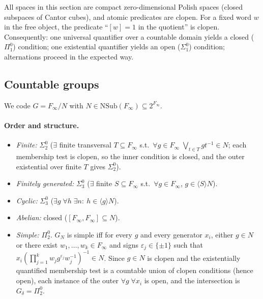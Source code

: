 \documentclass[12pt,fleqn,a4paper]{amsart}
\numberwithin{equation}{section}
\theoremstyle{definition}
\newcommand{\NSub}{\mathrm{NSub}}
\begin{document}
All spaces in this section are compact zero-dimensional Polish spaces (closed subspaces
of Cantor cubes), and atomic predicates are clopen.  For a fixed word $w$ in the free
object, the predicate ``$[w]=1$ in the quotient'' is clopen.  Consequently:
one universal quantifier over a countable domain yields a closed
($\Pi^0_1$) condition;
one existential quantifier yields an open ($\Sigma^0_1$) condition;
alternations proceed in the expected way.

\subsection{Countable groups}\label{subsec:groups}

We code $G=F_\infty/N$ with $N\in\NSub(F_\infty)\subseteq 2^{F_\infty}$.

\paragraph{Order and structure.}
\begin{itemize}
\item \emph{Finite:} $\Sigma^0_2$ ($\exists$ finite transversal
$T\subseteq F_\infty$ s.t.\ $\forall g\in F_\infty\;\bigvee_{t\in T} gt^{-1}\in N$;
each membership test is clopen, so the inner condition is closed, and the outer
existential over finite $T$ gives $\Sigma^0_2$).
\item \emph{Finitely generated:} $\Sigma^0_3$ ($\exists$ finite $S\subseteq F_\infty$
s.t.\ $\forall g\in F_\infty$, $g\in\langle S\rangle N$).
\item \emph{Cyclic:} $\Sigma^0_3$ ($\exists g\;\forall h\;\exists n:\ h\in\langle g\rangle N$).
\item \emph{Abelian:} closed ($[F_\infty,F_\infty]\subseteq N$).
\item \emph{Simple:} $\Pi^0_2$.
$G_N$ is simple iff for every $g$ and every generator $x_i$,
either $g\in N$ or there exist
$w_1,\dots,w_k\in F_\infty$ and signs $\varepsilon_j\in\{\pm1\}$ such that
$x_i(\prod_{j=1}^k w_j g^{\varepsilon_j} w_j^{-1})^{-1}\in N$.
Since $g\in N$ is clopen and the existentially quantified membership test is
a countable union of clopen conditions (hence open), each instance
of the outer $\forall g\;\forall x_i$ is open, and the intersection is $G_\delta=\Pi^0_2$.
\end{itemize}
\end{document}
